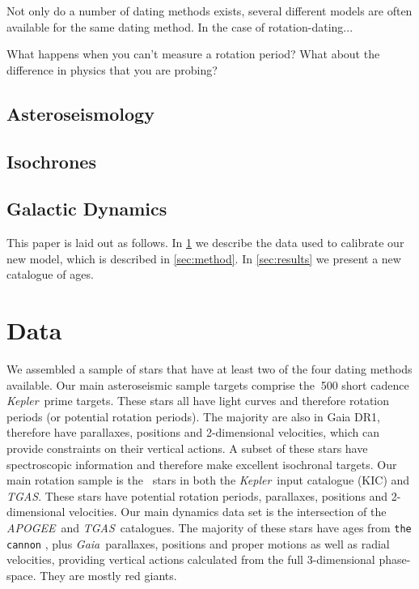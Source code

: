 \documentclass[useAMS, usenatbib, preprint, 12pt]{aastex}
\newcommand{\racomment}[1]{{\color{red}#1}}
\newcommand{\Kepler}{{\it Kepler}}
\newcommand{\kepler}{\Kepler}
\newcommand{\TGAS}{{\it TGAS}}
\newcommand{\tgas}{{\it TGAS}}
\newcommand{\apogee}{{\it APOGEE}}
\newcommand{\gaia}{{\it Gaia}}
\begin{document}
Not only do a number of dating methods exists, several different models are
often available for the same dating method.
In the case of rotation-dating...

\racomment{What happens when you can't measure a rotation period?}
\racomment{What about the difference in physics that you are probing?}

\subsection{Asteroseismology}

\subsection{Isochrones}

\subsection{Galactic Dynamics}

This paper is laid out as follows.
In \textsection \ref{sec:data} we describe the data used to calibrate our new
model, which is described in \textsection \ref{sec:method}.
In \textsection \ref{sec:results} we present a new catalogue of ages.

\section{Data}
\label{sec:data}
We assembled a sample of stars that have at least two of the four dating
methods available.
Our main asteroseismic sample targets comprise the $~$500 short cadence
\kepler\ prime targets.
These stars all have light curves and therefore rotation periods (or potential
rotation periods).
The majority are also in Gaia DR1, therefore have parallaxes, positions and
2-dimensional velocities, which can provide constraints on their vertical
actions.
A subset of these stars have spectroscopic information and therefore make
excellent isochronal targets.
Our main rotation sample is the \nkictgas\ stars in both the \kepler\ input
catalogue (KIC) and \TGAS.
These stars have potential rotation periods, parallaxes, positions and
2-dimensional velocities.
Our main dynamics data set is the intersection of the \apogee\ and \tgas\
catalogues.
The majority of these stars have ages from {\tt the cannon} \cite{Ness2015},
plus \gaia\ parallaxes, positions and proper motions as well as radial
velocities, providing vertical actions calculated from the full 3-dimensional
phase-space.
They are mostly red giants.
\end{document}
